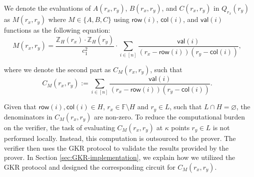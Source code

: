 We denote the evaluations of $A(r_x,r_y)$, $B(r_x,r_y)$, and $C(r_x,r_y)$ in $Q_{r_x}(r_y)$ as $M(r_x,r_y)$  where $M\in\{A, B, C\}$ using $\mathsf{row}(i)$, $\mathsf{col}(i)$, and $\mathsf{val}(i)$ functions as the following equation: 
\begin{equation}\label{eq:M_rx_ry}
	M(r_x, r_y) = \frac{\mathbb{Z}_H(r_x)\cdot\mathbb{Z}_H(r_y)}{c_1^2} \cdot \sum_{i\in[n]} \frac{\mathsf{val}(i)}{\left(r_x - \mathsf{row}(i)\right)\left(r_y - \mathsf{col}(i)\right)}, 
\end{equation}

where we denote the second part as $C_M(r_x, r_y)$, such that
\begin{equation}
	C_M(r_x, r_y) := \sum_{i\in[n]} \frac{\mathsf{val}(i)}{\left(r_x - \mathsf{row}(i)\right)\left(r_y - \mathsf{col}(i)\right)}.
	\label{eq:C_M}
\end{equation}


Given that $\mathsf{row}(i), \mathsf{col}(i) \in H$, $r_x \in \mathbb{F} \setminus   H$ and $r_y \in L$, such that $L\cap H=\varnothing$, the denominators in $C_M(r_x, r_y)$ are non-zero. To reduce the computational burden on the verifier, the task of evaluating $C_M(r_x, r_y)$ at $\kappa$ points $r_y \in L$ is not performed locally. Instead, this computation is outsourced to the prover. The verifier then uses the GKR protocol to validate the results provided by the prover. In Section \ref{sec:GKR-implementation}, we explain how we utilized the GKR protocol and designed the corresponding circuit for $C_M(r_x, r_y)$.


